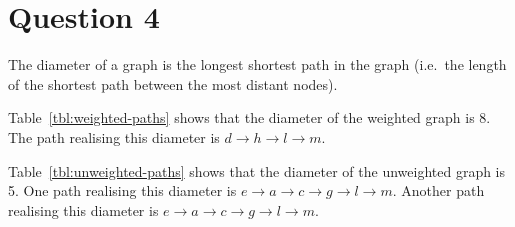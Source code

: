 \documentclass[a4paper,onecolumn,oneside]{article}
\begin{document}
\section*{Question 4}

The diameter of a graph is the longest shortest path in the graph (i.e.\ the
length of the shortest path between the most distant nodes).

Table~\ref{tbl:weighted-paths} shows that the diameter of the weighted graph is
8.  The path realising this diameter is $d\rightarrow h\rightarrow l\rightarrow
m$.

Table~\ref{tbl:unweighted-paths} shows that the diameter of the unweighted graph
is 5.  One path realising this diameter is $e\rightarrow a\rightarrow
c\rightarrow g\rightarrow l\rightarrow m$.  Another path realising this diameter
is $e\rightarrow a\rightarrow c\rightarrow g\rightarrow l\rightarrow m$.
\end{document}

